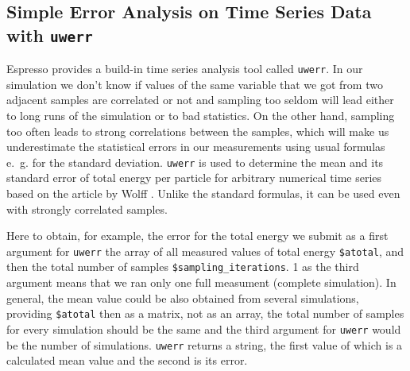\documentclass[
paper=a4,                       %
fontsize=11pt,                  %
twoside,                        %
footsepline,                    %
headsepline,                    %
headinclude=false,              %
footinclude=false,              %
pagesize,                       %
]{scrartcl}
\begin{document}
   





   
   
\subsection{Simple Error Analysis on Time Series Data with \texttt{uwerr}}

  \noindent Espresso provides a build-in time series analysis tool called \lstinline|uwerr|.
  In our simulation we don't know if values of the same variable that we got from two adjacent samples are
  correlated or not and sampling too seldom will lead either to long runs of the simulation
  or to bad statistics. On the other hand, sampling too often leads to strong correlations between the samples,
  which will make us underestimate the statistical errors in our measurements using usual formulas e.~g.
  for the standard deviation.
  \lstinline|uwerr| is used to determine the mean and its standard 
  error  of total energy per particle for arbitrary numerical time series based on
  the article by Wolff \cite{wolff}. Unlike the standard formulas, it can be used even with strongly correlated samples.

  Here to obtain, for example, the error for the total energy we submit as a first argument for 
  \lstinline|uwerr| the array of all measured values of total energy   \verb"$atotal", and then the total
  number of samples   \verb"$sampling_iterations". 1 as the third argument means that we ran only
  one full measument (complete simulation). In general, the mean value could be also obtained
  from several simulations, providing  \verb"$atotal" then as a matrix, not as an array, the total
  number of samples for every simulation should be the same and the third argument for \lstinline|uwerr|
  would be the number of simulations. \lstinline|uwerr| returns a string, the first value of which is 
  a calculated mean value and the second is its error.
\end{document}
